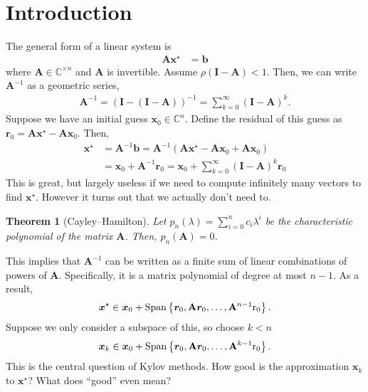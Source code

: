 \documentclass[12pt,a4paper]{article} %
\newtheorem*{theorem}{Theorem}
\DeclareMathOperator{\Span}{Span}
\begin{document}
\section{Introduction}
The general form of a linear system is 
\begin{align*}
    \mathbf A \bm x^\star &= \bm b
\end{align*}
where $\mathbf A \in \mathbb C^{ \times n}$ and $\mathbf A$ is invertible. 
Assume $\rho(\mathbf I - \mathbf A) < 1$. Then, we can write
$\mathbf A^{-1}$ as a geometric series,
\begin{align*}
    \mathbf A^{-1} = (\mathbf I - (\mathbf I - \mathbf A))^{-1} = \sum_{k=0}^\infty (\mathbf I-\mathbf A)^k.
\end{align*}
Suppose we have an initial guess $\bm x_0 \in \mathbb C^n$.
Define the residual of this guess as $\bm r_0 = \mathbf A \bm x^\star - \mathbf A \bm x_0$.
Then,
\begin{align*}
    \bm x^\star &= \mathbf A^{-1}\bm b = \mathbf A^{-1} 
    (\mathbf A \bm x^\star - \mathbf A \bm x_0 + \mathbf A \bm x_0) \\ 
    &= \bm x_0 + \mathbf A^{-1} \bm r_0 = \bm x_0 + \sum_{k=0}^\infty (\mathbf I-\mathbf A)^k \bm r_0
\end{align*}
This is great, but largely useless if we need to compute infinitely many vectors 
to find $\bm x^\star$. However it turns out that we actually don't need to.
\begin{theorem}[Cayley--Hamilton]
    Let $p_n(\lambda) = \sum_{i=0}^n c_i \lambda^i$ be the characteristic 
    polynomial of the matrix $\mathbf A$. Then, $p_n(\mathbf A) = 0$.
\end{theorem}
This implies that $\mathbf A^{-1}$ can be written as a finite sum of linear 
combinations of powers of $\mathbf A$. Specifically, it is a matrix polynomial 
of degree at most $n-1$. As a result, 
\begin{align*}
    \bm x^\star \in \bm x_0 + \Span \left\{ \bm r_0, \mathbf A \bm r_0, \ldots, \mathbf A^{n-1}\rm r_0\right\}.
\end{align*}
Suppose we only consider a subspace of this, so choose $k < n$
\begin{align*}
    \bm x_k \in \bm x_0 + \Span \left\{ \bm r_0, \mathbf A \bm r_0, \ldots, \mathbf A^{k-1}\rm r_0\right\}.
\end{align*}
This is the central question of Kylov methods. How good is the approximation $\bm x_k$ to 
$\bm x^\star$? What does ``good'' even mean?
\end{document}

